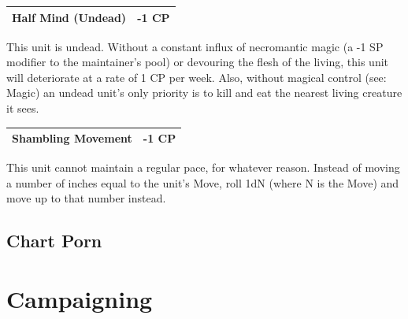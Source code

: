 \documentclass[12pt,a4paper,twocolumn]{article}
\begin{document}
\begin{tabular}{|l|c|} \hline
Half Mind (Undead) & -1 CP \\ \hline
\end{tabular}

This unit is undead.  Without a constant influx of necromantic magic (a -1 SP modifier to the maintainer's pool) or devouring the flesh of the living, this unit will deteriorate at a rate of 1 CP per week.  Also, without magical control (see: Magic) an undead unit's only priority is to kill and eat the nearest living creature it sees.

\begin{tabular}{|l|c|} \hline
Shambling Movement & -1 CP \\ \hline
\end{tabular}

This unit cannot maintain a regular pace, for whatever reason.  Instead of moving a number of inches equal to the unit's Move, roll 1dN (where N is the Move) and move up to that number instead.


\subsection{Chart Porn}

\section {Campaigning }
\end{document}
